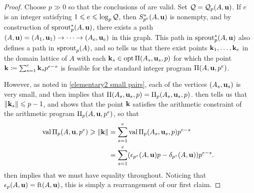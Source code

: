 \documentclass{amsart}
\begin{document}
\begin{proof}
   Choose $p \gg 0$ so that the conclusions of  are valid.
   Set $\mathcal{Q} = \mathcal{Q}_p(A,\mathbf{u})$.
   If $e$ is an integer satisfying $1 \leqslant e \leqslant \log_p\mathcal{Q}$, then $S_{p^e}^{\ast}(A,\mathbf{u})$ is nonempty, and by construction of $\operatorname{sprout}_p^{\ast}(A,\mathbf{u})$, there exists a path $(A,\mathbf{u}) = (A_1, \mathbf{u}_1) \to \cdots \to (A_e, \mathbf{u}_e)$ in this graph.
   This path in $\operatorname{sprout}_p^{\ast}(A,\mathbf{u})$ also defines a path in $\operatorname{sprout}_p(A)$, and so  tells us that there exist points $\mathbf{k}_1,\ldots,\mathbf{k}_e$ in the domain lattice of $A$ with each $\mathbf{k}_s \in \operatorname{opt} \Pi(A_s, \mathbf{u}_s, p)$ for which the point $\mathbf{k} \coloneqq \sum_{s=1}^e \mathbf{k}_s p^{e-s}$ is feasible for the standard integer program $\Pi(A, \mathbf{u}, p^e)$.

   However, as noted in \eqref{elementary2 small pairs}, each of the vertices $(A_s, \mathbf{u}_s)$ is very small, and   then implies that $\Pi(A_s,\mathbf{u}_s,p) = \Pi_p(A_s, \mathbf{u}_s, p)$.
    then tells us that $\| \mathbf{k}_s \| \leqslant p - 1$, and  shows that the point $\mathbf{k}$ satisfies the arithmetic constraint of the arithmetic program $\Pi_p(A,\mathbf{u},p^e)$, so that
   \begin{align*}
     \operatorname{val} \Pi_p(A,\mathbf{u},p^e) \geqslant  \| \mathbf{k} \| & = \sum_{s=1}^e \operatorname{val} \Pi_p(A_s,\mathbf{u}_s,p) p^{e-s} \\
                                                  & = \sum_{s=1}^e (\epsilon_{p^s}(A,\mathbf{u})p - \delta_{p^s}(A,\mathbf{u})) p^{e-s}.
   \end{align*}
    then implies that we must have equality throughout.
   Noticing that $\epsilon_p(A,\mathbf{u}) = \operatorname{ft}(A, \mathbf{u})$, this is simply a rearrangement of our first claim.


\end{proof}
\end{document}
